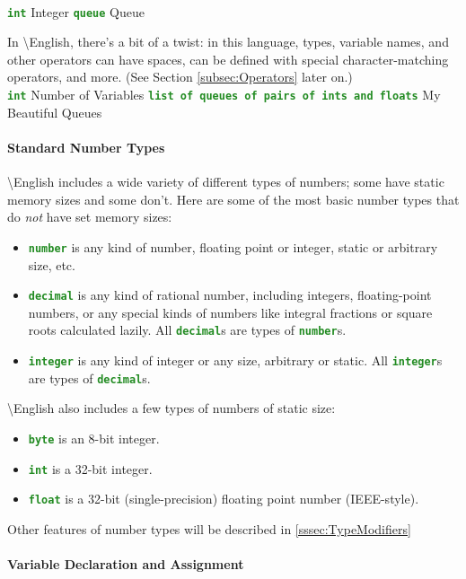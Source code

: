 \documentclass{article}
\newcommand{\name}{\textbackslash{}English}				%
\newcommand{\type}[1]{\texttt{\textcolor{ForestGreen}{\textbf{#1}}}}
\newenvironment{code}[0]
{\ttfamily{}				%
\setlength\parindent{0cm}	%
~\\}
{\setlength\parindent{1cm}
~\\}
\begin{document}
\begin{code}
\type{int} Integer
\type{queue} Queue
\end{code}

In \name{}, there's a bit of a twist: in this language, types, variable names, and other operators can have spaces, can be defined with special character-matching operators, and more. (See Section \ref{subsec:Operators} later on.)
\begin{code}
\type{int} Number of Variables
\type{list of queues of pairs of ints and floats} My Beautiful Queues
\end{code}

\paragraph{Standard Number Types}
\indent \name{} includes a wide variety of different types of numbers; some have static memory sizes and some don't. Here are some of the most basic number types that do \emph{not} have set memory sizes:
\begin{itemize}
	\item \type{number} is any kind of number, floating point or integer, static or arbitrary size, etc.
	\item \type{decimal} is any kind of rational number, including integers, floating-point numbers, or any special kinds of numbers like integral fractions or square roots calculated lazily. All \type{decimal}s are types of \type{number}s.
	\item \type{integer} is any kind of integer or any size, arbitrary or static. All \type{integer}s are types of \type{decimal}s.
\end{itemize}

\indent \name{} also includes a few types of numbers of static size:
\begin{itemize}
	\item \type{byte} is an 8-bit integer.
	\item \type{int} is a 32-bit integer.
	\item \type{float} is a 32-bit (single-precision) floating point number (IEEE-style).
\end{itemize}

\indent Other features of number types will be described in \ref{sssec:TypeModifiers}

\paragraph{Variable Declaration and Assignment}
\end{document}
